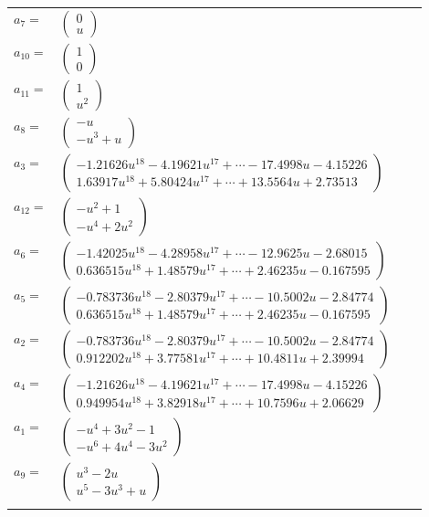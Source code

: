 \documentclass[1p]{elsarticle_modified}
\theoremstyle{definition}
\begin{document}
\begin{tabular}{m{7pt} m{180pt} m{7pt} m{180pt} }
\flushright $a_{7}=$&$\begin{pmatrix}0\\u\end{pmatrix}$ \\
\flushright $a_{10}=$&$\begin{pmatrix}1\\0\end{pmatrix}$ \\
\flushright $a_{11}=$&$\begin{pmatrix}1\\u^2\end{pmatrix}$ \\
\flushright $a_{8}=$&$\begin{pmatrix}- u\\- u^3+u\end{pmatrix}$ \\
\flushright $a_{3}=$&$\begin{pmatrix}-1.21626 u^{18}-4.19621 u^{17}+\cdots-17.4998 u-4.15226\\1.63917 u^{18}+5.80424 u^{17}+\cdots+13.5564 u+2.73513\end{pmatrix}$ \\
\flushright $a_{12}=$&$\begin{pmatrix}- u^2+1\\- u^4+2 u^2\end{pmatrix}$ \\
\flushright $a_{6}=$&$\begin{pmatrix}-1.42025 u^{18}-4.28958 u^{17}+\cdots-12.9625 u-2.68015\\0.636515 u^{18}+1.48579 u^{17}+\cdots+2.46235 u-0.167595\end{pmatrix}$ \\
\flushright $a_{5}=$&$\begin{pmatrix}-0.783736 u^{18}-2.80379 u^{17}+\cdots-10.5002 u-2.84774\\0.636515 u^{18}+1.48579 u^{17}+\cdots+2.46235 u-0.167595\end{pmatrix}$ \\
\flushright $a_{2}=$&$\begin{pmatrix}-0.783736 u^{18}-2.80379 u^{17}+\cdots-10.5002 u-2.84774\\0.912202 u^{18}+3.77581 u^{17}+\cdots+10.4811 u+2.39994\end{pmatrix}$ \\
\flushright $a_{4}=$&$\begin{pmatrix}-1.21626 u^{18}-4.19621 u^{17}+\cdots-17.4998 u-4.15226\\0.949954 u^{18}+3.82918 u^{17}+\cdots+10.7596 u+2.06629\end{pmatrix}$ \\
\flushright $a_{1}=$&$\begin{pmatrix}- u^4+3 u^2-1\\- u^6+4 u^4-3 u^2\end{pmatrix}$ \\
\flushright $a_{9}=$&$\begin{pmatrix}u^3-2 u\\u^5-3 u^3+u\end{pmatrix}$\\&\end{tabular}
\end{document}
